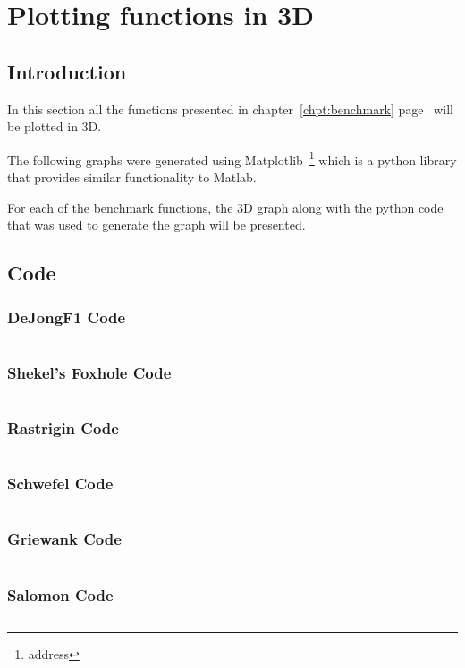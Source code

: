 \appendix
\label{chpt:apxA}
\chapter{Plotting functions in 3D}
\section{Introduction}
In this section all the functions presented in chapter~\ref{chpt:benchmark} page~\pageref{chpt:benchmark} will be plotted in 3D.

The following graphs were generated using Matplotlib~\footnote{address} which is a python library that provides similar functionality to Matlab.

For each of the benchmark functions, the 3D graph along with the python code that was used to generate the graph will be presented.

\section{Code}
\subsection{DeJongF1 Code}
\inputminted[fontsize=\tiny]{python}{./Graphs/dejongf1.py}
\subsection{Shekel's Foxhole Code}
\inputminted[fontsize=\tiny]{python}{./Graphs/shekelsfoxhole.py}
\subsection{Rastrigin Code}
\inputminted[fontsize=\tiny]{python}{./Graphs/rastrigin.py}
\subsection{Schwefel Code}
\inputminted[fontsize=\tiny]{python}{./Graphs/Schwefel.py}
\subsection{Griewank Code}
\inputminted[fontsize=\tiny]{python}{./Graphs/Griewank.py}
\subsection{Salomon Code}
\inputminted[fontsize=\tiny]{python}{./Graphs/Salomon.py}
